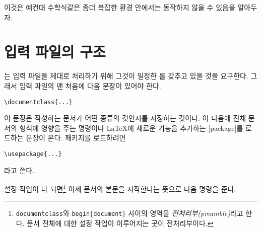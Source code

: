 이것은 예컨대 수학식같은 좀더 복잡한 환경 안에서는 동작하지 않을 수 있음을 알아두자.

\section{입력 파일의 구조} \label{sec:structure}

\LaTeXe 는 입력 파일을 제대로 처리하기 위해 그것이 일정한 를 갖추고 있을 것을 요구한다.
그래서 입력 파일의 맨 처음에 다음 문장이 있어야 한다.
\begin{code}
\verb|\documentclass{...}|
\end{code}
이 문장은 작성하는 문서가 어떤 종류의 것인지를 지정하는 것이다. 
이 다음에 전체 문서의 형식에 영향을 주는 명령이나 
\LaTeX 에 새로운 기능을 추가하는 [package]를 로드하는 문장이 온다.
패키지를 로드하려면 
\begin{code}
\verb|\usepackage{...}|
\end{code}
\noindent 라고 쓴다.

설정 작업이 다 되면\footnote{%
  \texttt{\bs documentclass}와 \texttt{\bs begin$\mathtt{\{}$document$\mathtt{\}}$}
  사이의 영역을 \emph{전처리부(preamble)}라고 한다.
  문서 전체에 대한 설정 작업이 이루어지는 곳이 전처리부이다.
}
이제 문서의 본문을 시작한다는 뜻으로 다음 명령을 준다.

